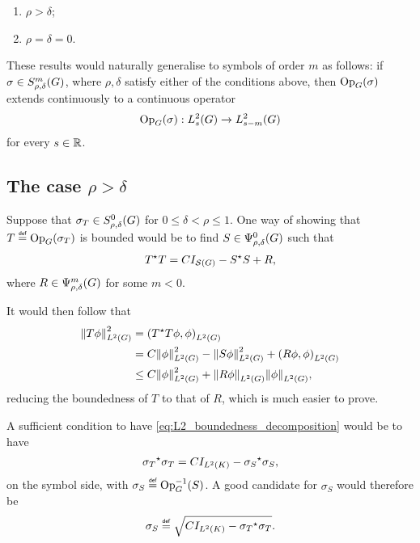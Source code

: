 \begin{enumerate}
    \item $\rho > \delta$;
    \item $\rho = \delta = 0$.
\end{enumerate}

These results would naturally generalise to symbols of order $m$ as follows:
if $\sigma \in \SymbolClass m {\rho, \delta}$,
where $\rho, \delta$ satisfy either of the conditions above,
then $\Op(\sigma)$ extends continuously to a continuous operator
\begin{align*}
    \Op(\sigma) : \Sobolev s \to \Sobolev {s - m}
\end{align*}
for every $s \in \R$.

\subsection{The case $\rho > \delta$}

Suppose that $\sigma_T \in \SymbolClass 0 {\rho, \delta}$ for $0 \leq \delta < \rho \leq 1$.
One way of showing that $T \defeq \Op(\sigma_T)$ is bounded would be to find $S \in \OperatorClass 0 {\rho, \delta}$ such that
\begin{align}
    \adj T T = C \Id {\Schwartz \Group} - \adj S S + R,
    \label{eq:L2_boundedness_decomposition}
\end{align}
where $R \in \OperatorClass m {\rho, \delta}$ for some $m < 0$.

It would then follow that
\begin{align*}
    \norm [\Lebesgue 2 \Group] {T \phi}^2
    &= \ip [\Lebesgue 2 \Group] {\adj T T \phi} \phi\\
    &= C \norm [\Lebesgue 2 \Group] {\phi}^2 - \norm [\Lebesgue 2 \Group] {S \phi}^2 + \ip [\Lebesgue 2 \Group] {R \phi} \phi\\
    &\leq C \norm [\Lebesgue 2 \Group] {\phi}^2 + \norm [\Lebesgue 2 \Group] {R \phi} \norm [\Lebesgue 2 \Group] \phi,
\end{align*}
reducing the boundedness of $T$ to that of $R$,
which is much easier to prove.

A sufficient condition to have \eqref{eq:L2_boundedness_decomposition} would be to have
\begin{align*}
    \adj {\sigma_T} \sigma_T = C \Id {\Lebesgue 2 \CompactGroup} - \adj {\sigma_S} \sigma_S,
\end{align*}
on the symbol side,
with $\sigma_S \defeq \Op^{-1}(S)$.
A good candidate for $\sigma_S$ would therefore be
\begin{align}
    \sigma_S \defeq \sqrt{C \Id {\Lebesgue 2 \CompactGroup} - \adj {\sigma_T} \sigma_T}.
    \label{eq:symbol_to_prove_L2_boundedness}
\end{align}

